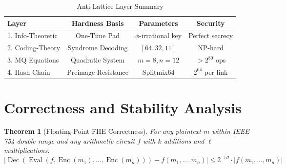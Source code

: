 \documentclass[11pt,a4paper]{article}
\newtheorem{theorem}{Theorem}[section]
\DeclareMathOperator{\Enc}{Enc}
\DeclareMathOperator{\Dec}{Dec}
\DeclareMathOperator{\Eval}{Eval}
\begin{document}
\begin{table}[H]
\centering
\caption{Anti-Lattice Layer Summary}
\label{tab:antilattice}
\begin{tabular}{@{}lccc@{}}
\toprule
\textbf{Layer} & \textbf{Hardness Basis} & \textbf{Parameters} & \textbf{Security} \\
\midrule
1. Info-Theoretic & One-Time Pad & $\phi$-irrational key & Perfect secrecy \\
2. Coding-Theory & Syndrome Decoding & $[64,32,11]$ & NP-hard \\
3. MQ Equations & Quadratic System & $m{=}8, n{=}12$ & $>2^{80}$ ops \\
4. Hash Chain & Preimage Resistance & Splitmix64 & $2^{64}$ per link \\
\bottomrule
\end{tabular}
\end{table}

\newpage

\section{Correctness and Stability Analysis}
\label{sec:correctness}

\begin{theorem}[Floating-Point FHE Correctness]
\label{thm:correctness}
For any plaintext $m$ within IEEE 754 double range and any arithmetic circuit $f$ with $k$ additions and $\ell$ multiplications:
\[
|\Dec(\Eval(f, \Enc(m_1), \ldots, \Enc(m_n))) - f(m_1, \ldots, m_n)| \leq 2^{-52} \cdot |f(m_1, \ldots, m_n)|
\]
\end{theorem}
\end{document}
